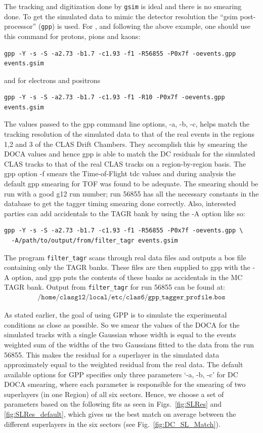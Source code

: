 The tracking and digitization done by \texttt{gsim} is ideal and there is no smearing done. To get the simulated data to mimic the detector resolution the ``gsim post-processor'' (\texttt{gpp}) is used. For , and following the above example, one should use this command for protons, pions and kaons:
\begin{verbatim}
gpp -Y -s -S -a2.73 -b1.7 -c1.93 -f1 -R56855 -P0x7f -oevents.gpp events.gsim
\end{verbatim}
and for electrons and positrons
\begin{verbatim}
gpp -Y -s -S -a2.73 -b1.7 -c1.93 -f1 -R10 -P0x7f -oevents.gpp events.gsim
\end{verbatim}
The values passed to the gpp command line options, -a, -b, -c, helps match the tracking resolution of the simulated data to that of the real events in the regions 1,2 and 3 of the CLAS Drift Chambers. They accomplish this by smearing the DOCA values and hence gpp is able to match the DC residuals for the simulated CLAS tracks to that of the real CLAS tracks on a region-by-region basis. The gpp option -f smears the Time-of-Flight tdc values and during analysis the default gpp smearing for TOF was found to be adequate. The smearing should be run with a good g12 run number; run 56855 has all the necessary constants in the database to get the tagger timing smearing done correctly. Also, interested parties can add accidentals to the TAGR bank by using the -A option like so:
\label{cmd:gppAoption}\begin{verbatim}
gpp -Y -s -S -a2.73 -b1.7 -c1.93 -f1 -R56855 -P0x7f -oevents.gpp \
  -A/path/to/output/from/filter_tagr events.gsim
\end{verbatim}
The program \texttt{filter\_tagr} scans through real data files and outputs a bos file containing only the TAGR banks. These files are then supplied to gpp with the -A option, and gpp puts the contents of these banks as accidentals in the MC TAGR bank. Output from \texttt{filter\_tagr} for run 56855 can be found at:
\begin{align}
    \texttt{/home/clasg12/local/etc/clas6/gpp\_tagger\_profile.bos} \nonumber
\end{align}


As stated earlier, the goal of using GPP is to simulate the experimental conditions as close as possible. So we smear the values of the DOCA for the simulated tracks with a single Gaussian whose width is equal to the events weighted sum of the widths of the two Gaussians fitted to the data from the run 56855. This makes the residual for a superlayer in the simulated data approximately equal to the weighted residual from the real data. The default available options for GPP specifies only three parameters `-a, -b, -c' for DC DOCA smearing, where each parameter is responsible for the smearing of two superlayers (in one Region) of all six sectors. Hence, we choose a set of parameters based on the following fits as seen in Figs.~\ref{fig:SLRes} and \ref{fig:SLRes_default}, which gives us the best match on average between the different superlayers in the six sectors (see Fig.~\ref{fig:DC_SL_Match}).

